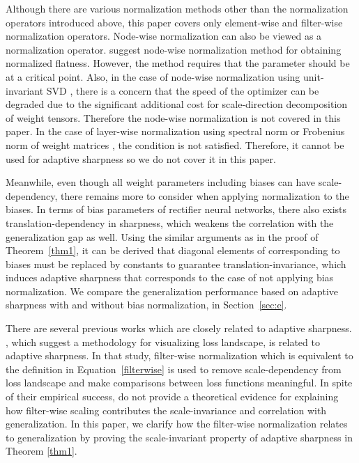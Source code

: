 \documentclass{article}
\begin{document}
Although there are various normalization methods other than the normalization operators introduced above, this paper covers only element-wise and filter-wise normalization operators. Node-wise normalization can also be viewed as a normalization operator. \citet{tsuzuku2020normalized} suggest node-wise normalization method for obtaining normalized flatness. However, the method requires that the parameter should be at a critical point. Also, in the case of node-wise normalization using unit-invariant SVD \citep{uhlmann2018generalized}, there is a concern that the speed of the optimizer can be degraded due to the significant additional cost for scale-direction decomposition of weight tensors. Therefore the node-wise normalization is not covered in this paper. In the case of layer-wise normalization using spectral norm or Frobenius norm of weight matrices \citep{neyshabur2017exploring}, the condition  is not satisfied. Therefore, it cannot be used for adaptive sharpness so we do not cover it in this paper. 

Meanwhile, even though all weight parameters including biases can have scale-dependency, there remains more to consider when applying normalization to the biases. In terms of bias parameters of rectifier neural networks, there also exists translation-dependency in sharpness, which weakens the correlation with the generalization gap as well. Using the similar arguments as in the proof of Theorem~\ref{thm1}, it can be derived that diagonal elements of  corresponding to biases must be replaced by constants to guarantee translation-invariance, which induces adaptive sharpness that corresponds to the case of not applying bias normalization. We compare the generalization performance based on adaptive sharpness with and without bias normalization, in Section~\ref{sec:e}.



There are several previous works which are closely related to adaptive sharpness.
\citet{li2018visualizing}, which suggest a methodology for visualizing loss landscape, is related to adaptive sharpness. In that study, filter-wise normalization which is equivalent to the definition in Equation~\ref{filterwise} is used to remove scale-dependency from loss landscape and make comparisons between loss functions meaningful. In spite of their empirical success, \citet{li2018visualizing} do not provide a theoretical evidence for explaining how filter-wise scaling contributes the scale-invariance and correlation with generalization. In this paper, we clarify how the filter-wise normalization relates to generalization by proving the scale-invariant property of adaptive sharpness in Theorem \ref{thm1}.
\end{document}
